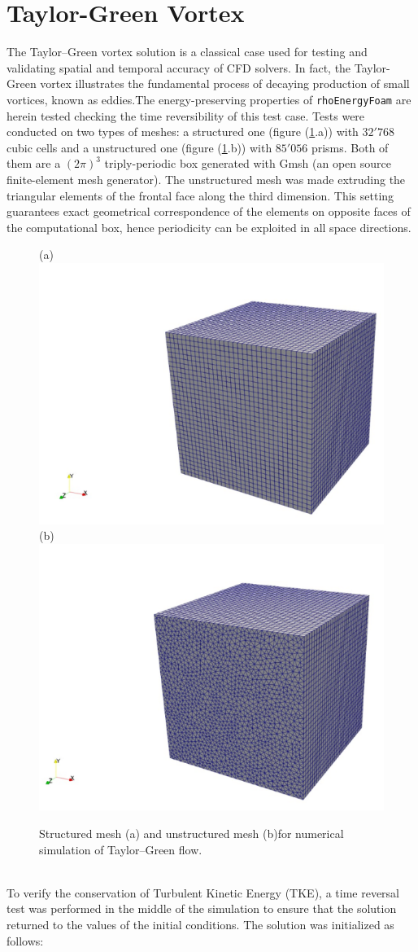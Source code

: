 \documentclass[a5paper]{sapthesis}
\begin{document}
	\section{Taylor-Green Vortex}
	The Taylor–Green vortex solution is a classical case used for testing and validating spatial and temporal accuracy of CFD solvers. In fact, the Taylor-Green vortex illustrates the fundamental process of decaying production of small vortices, known as eddies.The energy-preserving properties of \texttt{rhoEnergyFoam} are herein tested checking the time reversibility of this test case. Tests were conducted on two types of meshes: a structured one (figure (\ref{TGV_mesh}.a)) with $32'768$ cubic cells and a unstructured one (figure (\ref{TGV_mesh}.b)) with $85'056$ prisms. Both of them are a $(2\pi)^3$ triply-periodic box generated with Gmsh (an open source finite-element mesh generator). The unstructured mesh was made extruding the triangular elements of the frontal face along the third dimension. This setting guarantees exact geometrical correspondence of the elements on opposite faces of the computational box, hence periodicity can be exploited in all space directions.
	\begin{figure}
		\centering
		(a)\includegraphics[width=0.45\linewidth]{Figures/TGV_mesh_structured}
		(b)\includegraphics[width=0.45\linewidth]{Figures/TGV_mesh_unstructured}\\
		\caption{Structured mesh (a) and unstructured mesh (b)for numerical simulation of Taylor–Green ﬂow.}
		\label{TGV_mesh}
	\end{figure} 
	\\
	To verify the conservation of Turbulent Kinetic Energy (TKE), a time reversal test was performed in the middle of the simulation to ensure that the solution returned to the values of the initial conditions. 
	The solution was initialized as follows:
	
\end{document}
